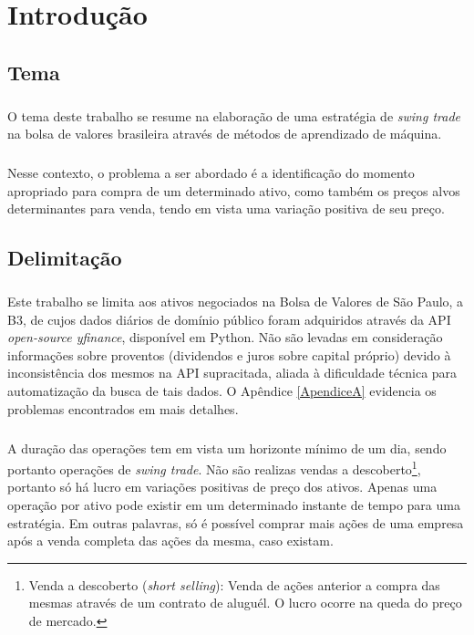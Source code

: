 \chapter{Introdução}
\label{cap1}



\FloatBarrier
\section{Tema}

\paragraph{} O tema deste trabalho se resume na elaboração de uma estratégia de \textit{swing trade} na bolsa de valores brasileira através de métodos de aprendizado de máquina.

\paragraph{} Nesse contexto, o problema a ser abordado é a identificação do momento apropriado para compra de um determinado ativo, como também os preços alvos determinantes para venda, tendo em vista uma variação positiva de seu preço.



\FloatBarrier
\section{Delimitação}

\paragraph{} Este trabalho se limita aos ativos negociados na Bolsa de Valores de São Paulo, a B3, de cujos dados diários de domínio público foram adquiridos através da API \textit{open-source yfinance}, disponível em Python. Não são levadas em consideração informações sobre proventos (dividendos e juros sobre capital próprio) devido à inconsistência dos mesmos na API supracitada, aliada à dificuldade técnica para automatização da busca de tais dados. O Apêndice \ref{ApendiceA} evidencia os problemas encontrados em mais detalhes.

\paragraph{} A duração das operações tem em vista um horizonte mínimo de um dia, sendo portanto operações de \textit{swing trade}. Não são realizas vendas a descoberto\footnote{Venda a descoberto (\textit{short selling}): Venda de ações anterior a compra das mesmas através de um contrato de aluguél. O lucro ocorre na queda do preço de mercado.}, portanto só há lucro em variações positivas de preço dos ativos. Apenas uma operação por ativo pode existir em um determinado instante de tempo para uma estratégia. Em outras palavras, só é possível comprar mais ações de uma empresa após a venda completa das ações da mesma, caso existam.

